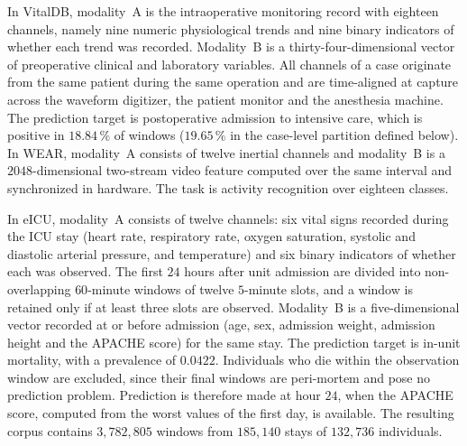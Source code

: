 In VitalDB, modality~A is the intraoperative monitoring record with eighteen
channels, namely nine numeric physiological trends and nine binary indicators
of whether each trend was recorded. Modality~B is a thirty-four-dimensional
vector of preoperative clinical and laboratory variables. All channels of a
case originate from the same patient during the same operation and are
time-aligned at capture across the waveform digitizer, the patient monitor and
the anesthesia machine. The prediction target is postoperative admission to
intensive care, which is positive in $18.84\,\%$ of windows ($19.65\,\%$ in
the case-level partition defined below). In WEAR,
modality~A consists of twelve inertial channels and modality~B is a
$2048$-dimensional two-stream video feature computed over the same interval and
synchronized in hardware. The task is activity recognition over eighteen
classes.

In eICU, modality~A consists of twelve channels: six vital signs recorded
during the ICU stay (heart rate, respiratory rate, oxygen saturation, systolic
and diastolic arterial pressure, and temperature) and six binary indicators of
whether each was observed. The first $24$ hours after unit admission are
divided into non-overlapping $60$-minute windows of twelve $5$-minute slots,
and a window is retained only if at least three slots are observed.
Modality~B is a five-dimensional vector recorded at or before admission (age,
sex, admission weight, admission height and the APACHE score) for the same
stay. The prediction target is in-unit mortality, with a prevalence of
$0.0422$. Individuals who die within the observation window are excluded,
since their final windows are peri-mortem and pose no prediction problem.
Prediction is therefore made at hour $24$, when the APACHE score, computed
from the worst values of the first day, is available. The
resulting corpus contains $3{,}782{,}805$ windows from $185{,}140$ stays of
$132{,}736$ individuals.

